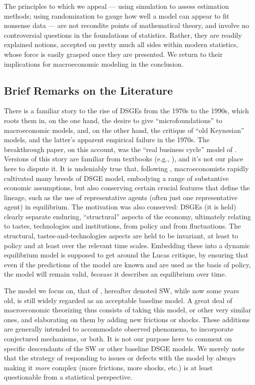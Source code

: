 \documentclass[11pt]{article}
\begin{document}
The principles to which we appeal --- using simulation to assess
estimation methods; using randomization to gauge how well a model can
appear to fit nonsense data --- are not recondite points of mathematical
theory, and involve no controversial questions in the foundations of
statistics. Rather, they are readily explained notions, accepted on
pretty much all sides within modern statistics, whose force is easily
grasped once they are presented. We return to their implications for
macroeconomic modeling in the conclusion.

\hypertarget{brief-remarks-on-the-literature}{%
\subsection{Brief Remarks on the
Literature}\label{brief-remarks-on-the-literature}}

There is a familiar story to the rise of DSGEs from the 1970s to the
1990s, which roots them in, on the one hand, the desire to give
``microfoundations'' to macroeconomic models, and, on the other hand,
the \citet{Lucas1976} critique of ``old Keynesian'' models, and the
latter's apparent empirical failure in the 1970s. The breakthrough
paper, on this account, was the ``real business cycle'' model of
\citet{KydlandPrescott1982}. Versions of this story are familiar from
textbooks (e.g., \citealt{DeJongDave2007}), and it's not our place here
to dispute it. It is undeniably true that, following
\citet{KydlandPrescott1982}, macroeconomists rapidly cultivated many
breeds of DSGE model, embodying a range of substantive economic
assumptions, but also conserving certain crucial features that define
the lineage, such as the use of representative agents (often just one
representative agent) in equilibrium. The motivation was also conserved:
DSGEs (it is held) clearly separate enduring, ``structural'' aspects of
the economy, ultimately relating to tastes, technologies and
institutions, from policy and from fluctuations. The structural,
tastes-and-technologies aspects are held to be invariant, at least to
policy and at least over the relevant time scales. Embedding these into
a dynamic equilibrium model is supposed to get around the Lucas
critique, by ensuring that even if the predictions of the model are
known and are used as the basis of policy, the model will remain valid,
\emph{because} it describes an equilibrium over time.

The model we focus on, that of \citet{SmetsWouters2007}, hereafter
denoted SW, while now some years old, is still widely regarded as an
acceptable baseline model. A great deal of macroeconomic theorizing thus
consists of taking this model, or other very similar ones, and
elaborating on them by adding new frictions or shocks. These additions
are generally intended to accommodate observed phenomena, to incorporate
conjectured mechanisms, or both. It is not our purpose here to comment
on specific descendants of the SW or other baseline DSGE models. We
merely note that the strategy of responding to issues or defects with
the model by always making it \emph{more} complex (more frictions, more
shocks, etc.) is at least questionable from a statistical perspective.
\end{document}
